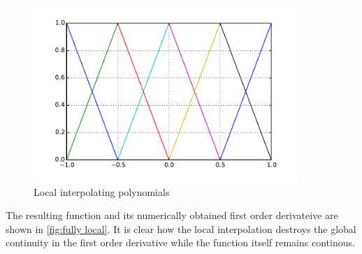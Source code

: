 \begin{figure}[H]
  \centering
  \includegraphics[width=10cm]{localone.pdf}
  \caption{Local interpolating polynomials}
  \label{fig:loc-pols}
\end{figure}

The resulting function and its numerically obtained first order derivateive are shown in \cref{fig:fully local}. It is clear how the local interpolation destroys the global continuity in the first order derivative while the function itself remains continous.


